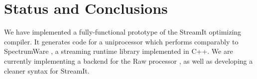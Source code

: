 \documentclass{sig-alternate}
\begin{document}





\section{Status and Conclusions}

We have implemented a fully-functional prototype of the StreamIt
optimizing compiler.  It generates code for a uniprocessor which
performs comparably to SpectrumWare \cite{spectrumware}, a streaming
runtime library implemented in C++.  We are currently implementing a
backend for the Raw processor \cite{raw}, as well as developing a
cleaner syntax for StreamIt.
\end{document}
